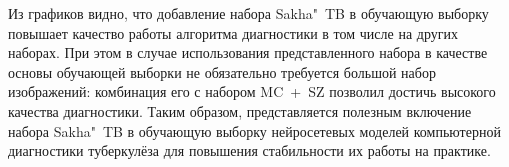 



Из графиков видно, что добавление набора Sakha"~TB в обучающую выборку повышает качество работы алгоритма диагностики в том числе на других наборах. При этом в случае использования представленного набора в качестве основы обучающей выборки не обязательно требуется большой набор изображений: комбинация его с набором MC~+~SZ позволил достичь высокого качества диагностики. Таким образом, представляется полезным включение набора Sakha"~TB в обучающую выборку нейросетевых моделей компьютерной диагностики туберкулёза для повышения стабильности их работы на практике.

\clearpage
